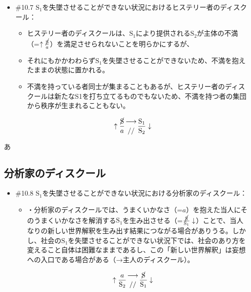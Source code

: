 \begin{note}{}
  \begin{itemize}
    \tightlist
    \item{\#10.7} $\textrm{S}_1$を失墜させることができない状況におけるヒステリー者のディスクール：
      \begin{itemize}
        \tightlist
        \item ヒステリー者のディスクールは、$\textrm{S}_1$により提供される$\textrm{S}_2$が主体の不満（=$\uparrow\frac{\cancel{\textrm{S}}}{a}$）を満足させられないことを明らかにするが、
        \item それにもかかわわらず$\textrm{S}_1$を失墜させることができないため、不満を抱えたままの状態に置かれる。
        \item 不満を持っている者同士が集まることもあるが、ヒステリー者のディスクールは新たなS1を打ち立てるものでもないため、不満を持つ者の集団から秩序が生まれることもない。
      \end{itemize}

$$
\uparrow\frac{\cancel{\textrm{S}}}{a}\genfrac{}{}{0pt}{}{\longrightarrow}{//}\frac{\mathrm{S_1}}{\mathrm{S_2}}\downarrow
$$
  \end{itemize}
\end{note}

あ

\subsection{分析家のディスクール}\label{ux5206ux6790ux5bb6ux306eux30c7ux30a3ux30b9ux30afux30fcux30eb}

\begin{note}{}
  \begin{itemize}
    \tightlist
    \item{\#10.8} $\textrm{S}_1$を失墜させることができない状況における分析家のディスクール：
      \begin{itemize}
        \tightlist
        \item ・分析家のディスクールでは、うまくいかなさ（=$a$）を抱えた当人にそのうまくいかなさを解消する$\textrm{S}_1$を生み出させる（=$\frac{\cancel{\textrm{S}}}{\textrm{S}_1}\downarrow$）ことで、当人なりの新しい世界解釈を生み出す結果につながる場合がありうる。しかし、社会の$\textrm{S}_1$を失墜させることができない状況下では、社会のあり方を変えること自体は困難なままであるし、この「新しい世界解釈」は妄想への入口である場合がある（→主人のディスクール）。
      \end{itemize}

$$
\uparrow\frac{a}{\mathrm{S_2}}\genfrac{}{}{0pt}{}{\longrightarrow}{//}\frac{\cancel{\textrm{S}}}{\mathrm{S_1}}\downarrow
$$
  \end{itemize}
\end{note}

